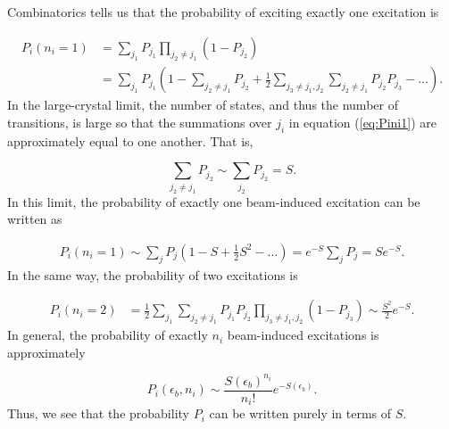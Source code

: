 \documentclass[twoside,twocolumn,9pt]{article}
\begin{document}
Combinatorics tells us that the probability of exciting exactly one excitation
is

\begin{equation}
  \begin{aligned}
    P_i(n_i=1)
    &=
    \sum_{j_1} P_{j_1}
    \prod_{j_2\neq j_1} (1 - P_{j_2})
    \\&=
    \sum_{j_1} P_{j_1}
    \left(
      1 - \sum_{j_2\neq j_1} P_{j_2}
      + \frac{1}{2} \sum_{j_3\neq j_1,j_2} \sum_{j_2\neq j_1} P_{j_2} P_{j_3}
      - \dots
    \right).
  \label{eq:Pini1}
  \end{aligned}
\end{equation}
%
In the large-crystal limit, the number of states, and thus the number of
transitions, is large so that the summations over $j_i$ in equation
(\ref{eq:Pini1}) are approximately equal to one another.
That is,

\begin{equation}
  \sum_{j_2\neq j_1}P_{j_2}
  \sim
  \sum_{j_2}P_{j_2}
  =
  S.
\end{equation}
%
In this limit, the probability of exactly one beam-induced excitation can be
written as

\begin{equation}
  \begin{aligned}
  P_i(n_i=1)
  \sim
  \sum_j P_j
  \left( 1 - S + \frac{1}{2}S^2 - \dots \right)
  =
  e^{-S}\sum_j P_j
  =
  Se^{-S}.
\end{aligned}
\label{eq:Pi(1)}
\end{equation}
%
In the same way, the probability of two excitations is

\begin{equation}
\begin{aligned}
  P_i(n_i=2)
  &=
  \frac{1}{2} \sum_{j_1} \sum_{j_2\neq j_1} P_{j_1} P_{j_2}
  \prod_{j_3\neq j_1,j_2} (1 - P_{j_3})
  \sim
  \frac{S^2}{2}e^{-S}.
\end{aligned}
\end{equation}
%
In general, the probability of exactly $n_i$ beam-induced excitations is
approximately

\begin{equation}
  P_i(\epsilon_b, n_i)
  \sim
  \frac{S(\epsilon_b)^{n_i}}{n_i!}
  e^{-S(\epsilon_b)}.
  \label{eq:Pi}
\end{equation}
%
Thus, we see that the probability $P_i$ can be written purely in terms of $S$.
\end{document}
